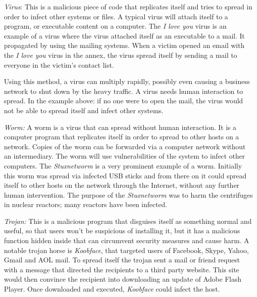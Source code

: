 % 
 
\begin{description}
\item \textit{Virus}: This is a malicious piece of code that replicates itself and tries to spread in order  to infect other systems or files. A typical virus will attach itself to a program, or executable content on a computer. The \textit{I love you} virus is an example of a virus where the virus attached itself as an executable to a mail. It propagated by using the mailing systems. When a victim opened an email with the \textit{I love you} virus in the annex, the virus spread itself by sending a mail to everyone in the victim's contact list. 

Using this method, a virus can multiply rapidly, possibly even causing a business network to shut down by the heavy traffic. A virus needs human interaction to spread. In the example above: if no one were to open the mail, the virus would not be able to spread itself and infect other systems.

\item \textit{Worm:} A worm is a virus that can spread without human interaction. It is a computer program that replicates itself in order to spread to other hosts on a network. Copies of the worm can be forwarded via a computer network without an intermediary. The worm will use vulnerabilities of the system to infect other computers.
The \textit{Stuxnetworm} is a very prominent example of a worm. Initially this worm was spread via infected USB sticks and from there on it could spread itself to other hosts on the network through the Internet, without any further human intervention. The purpose of the \textit{Stuxnetworm} was to harm the centrifuges in nuclear reactors; many reactors have been infected.  

\item \textit{Trojan:} This is a malicious program that disguises itself as something normal and useful, so that users won't be suspicious of installing it, but it has a malicious function hidden inside that can circumvent security measures and cause harm.  A notable trojan horse is \textit{Koobface}, that targeted users of Facebook, Skype, Yahoo, Gmail and AOL mail. To spread itself the trojan sent a mail or friend request with a message that directed the recipients to a third party website. This site would then convince the recipient into downloading an update of Adobe Flash Player. Once downloaded and executed, \textit{Koobface }could infect the host.

\end{description}
